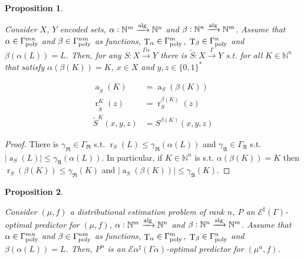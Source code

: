 \documentclass{article}
\numberwithin{equation}{section}
\theoremstyle{definition}
\theoremstyle{plain}
\newtheorem{proposition}{Proposition}[section]
\newcommand{\Bool}{\{0,1\}}
\newcommand{\Words}{{\Bool^*}}
\DeclareMathOperator{\T}{T}
\DeclareMathOperator{\R}{r}
\DeclareMathOperator{\A}{a}
\newcommand{\Nats}{\mathbb{N}}
\newcommand{\Abs}[1]{\lvert #1 \rvert}
\newcommand{\GrowR}{\Gamma_{\mathfrak{R}}}
\newcommand{\GrowA}{\Gamma_{\mathfrak{A}}}
\newcommand{\Fall}{\mathcal{E}}
\newcommand{\ESG}{\Fall^\sharp(\Gamma)}
\newcommand{\Alg}{\xrightarrow{\textnormal{alg}}}
\newcommand{\Scheme}{\xrightarrow{\Gamma}}
\begin{document}
\begin{samepage}
\begin{proposition}
\label{prp:rev_sch_idx}

Consider  ${X}$, ${Y}$ encoded sets, ${\alpha: \Nats^m \Alg \Nats^n}$ and ${\beta: \Nats^n \Alg \Nats^m}$. Assume that ${\alpha \in \Gamma_{\textnormal{poly}}^{mn}}$ and ${\beta \in \Gamma_{\textnormal{poly}}^{nm}}$ as functions, ${\T_\alpha \in \Gamma_{\textnormal{poly}}^m}$, ${\T_\beta \in \Gamma_{\textnormal{poly}}^n}$ and ${\beta(\alpha(L))=L}$. Then, for any  ${S: X \xrightarrow{\Gamma \alpha} Y}$ there is ${\tilde{S}: X \Scheme Y}$ s.t. for all ${K \in \Nats^n}$ that satisfy ${\alpha(\beta(K))=K}$, ${x \in X}$ and ${y,z \in \Words}$

\begin{align}
\A_{\tilde{S}}(K)&=\A_S(\beta(K)) \\
\R_{\tilde{S}}^K(z)&=\R_S^{\beta(K)}(z) \\
\tilde{S}^K(x,y,z)&=S^{\beta(K)}(x,y,z)
\end{align}

\end{proposition}
\end{samepage}

\begin{proof}

There is ${\gamma_{\mathfrak{R}} \in \GrowR}$ s.t. ${\R_S(L) \leq \gamma_{\mathfrak{R}}(\alpha(L))}$ and ${\gamma_{\mathfrak{A}} \in \GrowA}$ s.t. ${\Abs{\A_S(L)} \leq \gamma_{\mathfrak{A}}(\alpha(L))}$. In particular, if ${K \in \Nats^n}$ is s.t. ${\alpha(\beta(K))=K}$ then ${\R_S(\beta(K)) \leq \gamma_{\mathfrak{R}}(K)}$ and ${\Abs{\A_S(\beta(K))} \leq \gamma_{\mathfrak{A}}(K)}$.
%
\end{proof}

\begin{samepage}
\begin{proposition}
\label{prp:idx_reduce_sharp}

Consider $(\mu,f)$ a distributional estimation problem of rank ${n}$, ${P}$ an ${\ESG}$-optimal predictor for ${(\mu,f)}$, ${\alpha: \Nats^m \Alg \Nats^n}$ and ${\beta: \Nats^n \Alg \Nats^m}$. Assume that ${\alpha \in \Gamma_{\textnormal{poly}}^{mn}}$ and ${\beta \in \Gamma_{\textnormal{poly}}^{nm}}$ as functions, ${\T_\alpha \in \Gamma_{\textnormal{poly}}^m}$, ${\T_\beta \in \Gamma_{\textnormal{poly}}^n}$ and ${\beta(\alpha(L))=L}$. Then, ${P^\alpha}$ is an ${\Fall \alpha^\sharp(\Gamma \alpha)}$-optimal predictor for ${(\mu^\alpha,f)}$.

\end{proposition}
\end{samepage}
\end{document}
